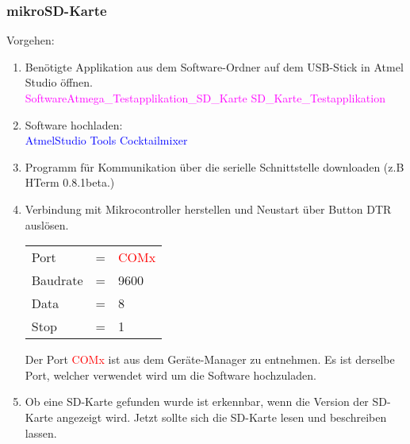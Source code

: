 \subsubsection{mikroSD-Karte}
\label{subsubsec:Inbetriebnahme_mikroSD_Karte}

Vorgehen:
\begin{enumerate}
\item Benötigte Applikation aus dem Software-Ordner auf dem USB-Stick in Atmel Studio öffnen.\\
\textcolor{magenta}{Software\textrightarrow Atmega\_Testapplikation\_SD\_Karte \textrightarrow SD\_Karte\_Testapplikation}\\

\item Software hochladen:\\
\textcolor{blue}{AtmelStudio \textrightarrow Tools \textrightarrow Cocktailmixer}\\

\item Programm für Kommunikation über die serielle Schnittstelle downloaden (z.B HTerm 0.8.1beta.)\cite{hammer_hterm_nodate}\\
\item Verbindung mit Mikrocontroller herstellen und Neustart über Button DTR auslösen.\\

\begin{table}[h!]
\center
\begin{tabular}{lcl}
Port & = & \textcolor{red}{COMx} \\
Baudrate & = & 9600 \\
Data & = & 8 \\
Stop & = & 1 \\
\end{tabular}
\end{table}

Der Port \textcolor{red}{COMx} ist aus dem Geräte-Manager zu entnehmen. Es ist derselbe Port, welcher verwendet wird um die Software hochzuladen.\\

\item Ob eine SD-Karte gefunden wurde ist erkennbar, wenn die Version der SD-Karte angezeigt wird. Jetzt sollte sich die SD-Karte lesen und beschreiben lassen.

\end{enumerate}
